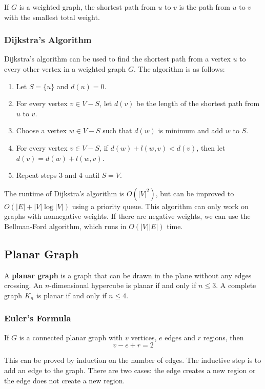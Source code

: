 \documentclass[a4paper,12pt]{article}
\begin{document}
If $G$ is a weighted graph, the shortest path from $u$ to $v$ is the path from $u$ to $v$ with the smallest total weight.

\subsubsection{Dijkstra's Algorithm}

Dijkstra's algorithm can be used to find the shortest path from a vertex $u$ to every other vertex in a weighted graph $G$.
The algorithm is as follows:
\begin{enumerate}
	\item Let $S = \{u\}$ and $d(u) = 0$.
	\item For every vertex $v \in V - S$, let $d(v)$ be the length of the shortest path from $u$ to $v$.
	\item Choose a vertex $w \in V - S$ such that $d(w)$ is minimum and add $w$ to $S$.
	\item For every vertex $v \in V - S$, if $d(w) + l(w,v) < d(v)$, then let $d(v) = d(w) + l(w,v)$.
	\item Repeat steps 3 and 4 until $S = V$.
\end{enumerate}

The runtime of Dijkstra's algorithm is $O(|V|^2)$, but can be improved to $O(|E| + |V| \log |V|)$ using a priority queue.
This algorithm can only work on graphs with nonnegative weights.
If there are negative weights, we can use the Bellman-Ford algorithm, which runs in $O(|V||E|)$ time.

\subsection{Planar Graph}

A \textbf{planar graph} is a graph that can be drawn in the plane without any edges crossing.
An $n$-dimensional hypercube is planar if and only if $n \leq 3$.
A complete graph $K_n$ is planar if and only if $n \leq 4$.

\subsubsection{Euler's Formula}

If $G$ is a connected planar graph with $v$ vertices, $e$ edges and $r$ regions, then
\begin{equation*}
	v - e + r = 2
\end{equation*}

This can be proved by induction on the number of edges.
The inductive step is to add an edge to the graph.
There are two cases: the edge creates a new region or the edge does not create a new region.
\end{document}
